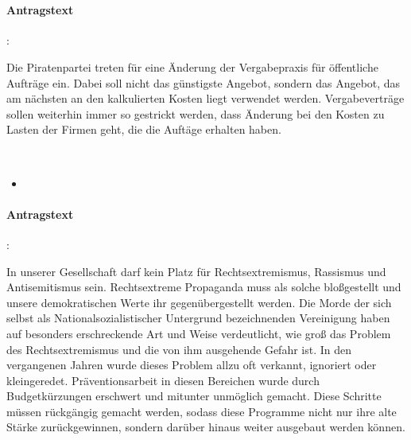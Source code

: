 
\\

\paragraph{Antragstext}:

Die Piratenpartei treten für eine Änderung der Vergabepraxis für öffentliche Aufträge ein. Dabei soll nicht das günstigste Angebot, sondern das Angebot, das am nächsten an den kalkulierten Kosten liegt verwendet werden. Vergabeverträge sollen weiterhin immer so gestrickt werden, dass Änderung bei den Kosten zu Lasten der Firmen geht, die die Auftäge erhalten haben.



\label{sa:rechtsex1}
\\
\begin{itemize}
\item {}
\end{itemize}

\paragraph{Antragstext}:

In unserer Gesellschaft darf kein Platz für Rechtsextremismus, Rassismus und Antisemitismus sein. Rechtsextreme Propaganda muss als solche bloßgestellt und unsere demokratischen Werte ihr gegenübergestellt werden. Die Morde der sich selbst als {\Gu}Nationalsozialistischer Untergrund{\Go} bezeichnenden Vereinigung haben auf besonders erschreckende Art und Weise verdeutlicht, wie groß das Problem des Rechtsextremismus und die von ihm ausgehende Gefahr ist. In den vergangenen Jahren wurde dieses Problem allzu oft verkannt, ignoriert oder kleingeredet. Präventionsarbeit in diesen Bereichen wurde durch Budgetkürzungen erschwert und mitunter unmöglich gemacht. Diese Schritte müssen rückgängig gemacht werden, sodass diese Programme nicht nur ihre alte Stärke zurückgewinnen, sondern darüber hinaus weiter ausgebaut werden können.

